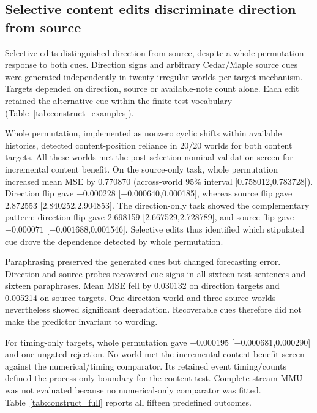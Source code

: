 \subsection{Selective content edits discriminate direction from source}

Selective edits distinguished direction from source, despite a whole-permutation response to both cues. Direction signs and arbitrary Cedar/Maple source cues were generated independently in twenty irregular worlds per target mechanism. Targets depended on direction, source or available-note count alone. Each edit retained the alternative cue within the finite test vocabulary (Table~\ref{tab:construct_examples}).



Whole permutation, implemented as nonzero cyclic shifts within available histories, detected content-position reliance in 20/20 worlds for both content targets. All these worlds met the post-selection nominal validation screen for incremental content benefit. On the source-only task, whole permutation increased mean MSE by 0.770870 (across-world 95\% interval [0.758012,0.783728]). Direction flip gave $-0.000228$ [$-0.000640$,0.000185], whereas source flip gave 2.872553 [2.840252,2.904853]. The direction-only task showed the complementary pattern: direction flip gave 2.698159 [2.667529,2.728789], and source flip gave $-0.000071$ [$-0.001688$,0.001546]. Selective edits thus identified which stipulated cue drove the dependence detected by whole permutation.

Paraphrasing preserved the generated cues but changed forecasting error. Direction and source probes recovered cue signs in all sixteen test sentences and sixteen paraphrases. Mean MSE fell by 0.030132 on direction targets and 0.005214 on source targets. One direction world and three source worlds nevertheless showed significant degradation. Recoverable cues therefore did not make the predictor invariant to wording.

For timing-only targets, whole permutation gave $-0.000195$ [$-0.000681$,0.000290] and one ungated rejection. No world met the incremental content-benefit screen against the numerical/timing comparator. Its retained event timing/counts defined the process-only boundary for the content test. Complete-stream MMU was not evaluated because no numerical-only comparator was fitted. Table~\ref{tab:construct_full} reports all fifteen predefined outcomes.

